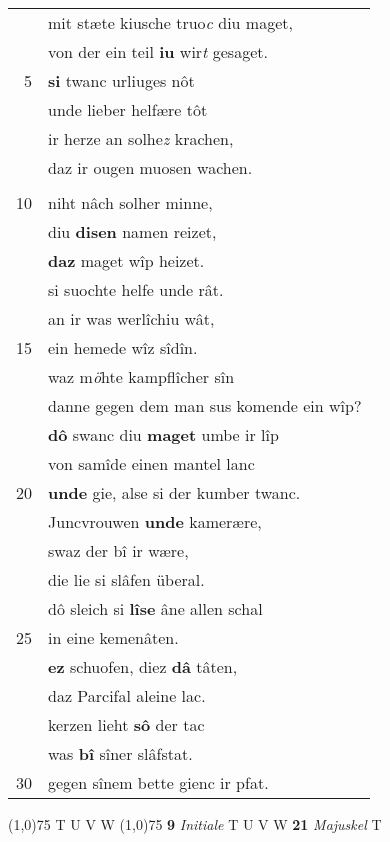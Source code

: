 \documentclass[8pt,a4paper,notitlepage]{article}
\begin{document}
\begin{table}[ht]
\begin{minipage}[t]{0.5\linewidth}
\begin{tabular}{rl}
 & mit stæte kiusche truo\textit{c} diu maget,\\ 
 & von der ein teil \textbf{iu} wir\textit{t} gesaget.\\ 
5 & \textbf{si} twanc urliuges nôt\\ 
 & unde lieber helfære tôt\\ 
 & ir herze an solhe\textit{z} krachen,\\ 
 & daz ir ougen muosen wachen.\\ 
 & \textbf{\begin{large}D\end{large}ô} gie diu küneginne\\ 
10 & niht nâch solher minne,\\ 
 & diu \textbf{disen} namen reizet,\\ 
 & \textbf{daz} maget wîp heizet.\\ 
 & si suochte helfe unde rât.\\ 
 & an ir was werlîchiu wât,\\ 
15 & ein hemede wîz sîdîn.\\ 
 & waz m\textit{ö}hte kampflîcher sîn\\ 
 & danne gegen dem man sus komende ein wîp?\\ 
 & \textbf{dô} swanc diu \textbf{maget} umbe ir lîp\\ 
 & von samîde einen mantel lanc\\ 
20 & \textbf{unde} gie, alse si der kumber twanc.\\ 
 & Juncvrouwen \textbf{unde} kamerære,\\ 
 & swaz der bî ir wære,\\ 
 & die lie si slâfen überal.\\ 
 & dô sleich si \textbf{lîse} âne allen schal\\ 
25 & in eine kemenâten.\\ 
 & \textbf{ez} schuofen, diez \textbf{dâ} tâten,\\ 
 & daz Parcifal aleine lac.\\ 
 & kerzen lieht \textbf{sô} der tac\\ 
 & was \textbf{bî} sîner slâfstat.\\ 
30 & gegen sînem bette gienc ir pfat.\\ 
\end{tabular}
\scriptsize
\line(1,0){75} \newline
T U V W \newline
\line(1,0){75} \newline
\textbf{9} \textit{Initiale} T U V W  \textbf{21} \textit{Majuskel} T  \newline

\end{minipage}
\end{table}
\end{document}
